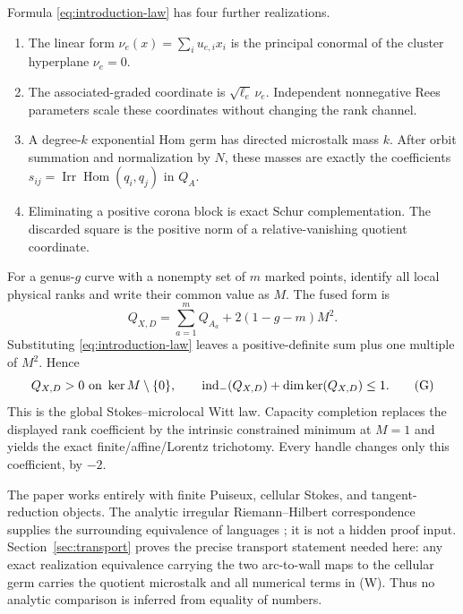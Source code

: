 \documentclass[11pt,a4paper]{amsart}
\theoremstyle{plain}
\theoremstyle{definition}
\newcommand{\Irr}{\operatorname{Irr}}
\newcommand{\Hom}{\operatorname{Hom}}
\newcommand{\indm}{\operatorname{ind}_{-}}
\begin{document}
Formula \eqref{eq:introduction-law} has four further realizations.
\begin{enumerate}[label=(\roman*),leftmargin=2.2em]
\item The linear form $\nu_e(x)=\sum_i u_{e,i}x_i$ is the principal conormal of the cluster
hyperplane $\nu_e=0$.
\item The associated-graded coordinate is $\sqrt{\ell_e}\,\nu_e$.  Independent nonnegative Rees
parameters scale these coordinates without changing the rank channel.
\item A degree-$k$ exponential Hom germ has directed microstalk mass $k$.  After orbit summation
and normalization by $N$, these masses are exactly the coefficients
$s_{ij}=\Irr\Hom(q_i,q_j)$ in $Q_A$.
\item Eliminating a positive corona block is exact Schur complementation.  The discarded square is
the positive norm of a relative-vanishing quotient coordinate.
\end{enumerate}

For a genus-$g$ curve with a nonempty set of $m$ marked points, identify all local physical ranks
and write their common value as $M$.  The fused form is
\begin{equation}\label{eq:introduction-fusion}
                   Q_{X,D}=\sum_{a=1}^{m}Q_{A_a}+2(1-g-m)M^2.
\end{equation}
Substituting \eqref{eq:introduction-law} leaves a positive-definite sum plus one multiple of
$M^2$.  Hence
\begin{equation}\label{eq:introduction-index}
             Q_{X,D}>0\ \hbox{on }\ker M\setminus\{0\},\qquad
             \indm(Q_{X,D})+\dim\ker(Q_{X,D})\leq1.          \tag{G}
\end{equation}
This is the global Stokes--microlocal Witt law.  Capacity completion replaces the displayed
rank coefficient by the intrinsic constrained minimum at $M=1$ and yields the exact
finite/affine/Lorentz trichotomy.  Every handle changes only this coefficient, by $-2$.

The paper works entirely with finite Puiseux, cellular Stokes, and tangent-reduction objects.  The
analytic irregular Riemann--Hilbert correspondence supplies the surrounding equivalence of
languages \cite{SabbahStokes,DKRH}; it is not a hidden proof input.  Section~\ref{sec:transport}
proves the precise transport statement needed here: any exact realization equivalence carrying
the two arc-to-wall maps to the cellular germ carries the quotient microstalk and all numerical
terms in (W).  Thus no analytic comparison is inferred from equality of numbers.
\end{document}
